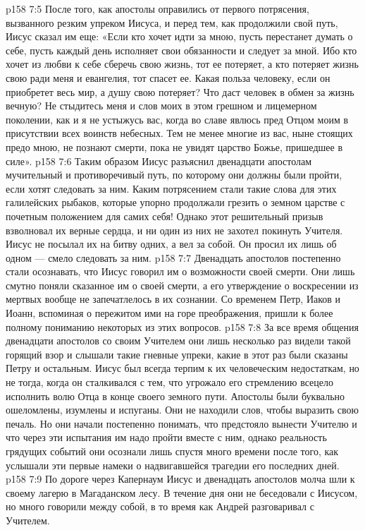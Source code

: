 \vs p158 7:5 После того, как апостолы оправились от первого потрясения, вызванного резким упреком Иисуса, и перед тем, как продолжили свой путь, Иисус сказал им еще: «Если кто хочет идти за мною, пусть перестанет думать о себе, пусть каждый день исполняет свои обязанности и следует за мной. Ибо кто хочет из любви к себе сберечь свою жизнь, тот ее потеряет, а кто потеряет жизнь свою ради меня и евангелия, тот спасет ее. Какая польза человеку, если он приобретет весь мир, а душу свою потеряет? Что даст человек в обмен за жизнь вечную? Не стыдитесь меня и слов моих в этом грешном и лицемерном поколении, как и я не устыжусь вас, когда во славе явлюсь пред Отцом моим в присутствии всех воинств небесных. Тем не менее многие из вас, ныне стоящих предо мною, не познают смерти, пока не увидят царство Божье, пришедшее в силе».
\vs p158 7:6 Таким образом Иисус разъяснил двенадцати апостолам мучительный и противоречивый путь, по которому они должны были пройти, если хотят следовать за ним. Каким потрясением стали такие слова для этих галилейских рыбаков, которые упорно продолжали грезить о земном царстве с почетным положением для самих себя! Однако этот решительный призыв взволновал их верные сердца, и ни один из них не захотел покинуть Учителя. Иисус не посылал их на битву одних, а вел за собой. Он просил их лишь об одном --- смело следовать за ним.
\vs p158 7:7 Двенадцать апостолов постепенно стали осознавать, что Иисус говорил им о возможности своей смерти. Они лишь смутно поняли сказанное им о своей смерти, а его утверждение о воскресении из мертвых вообще не запечатлелось в их сознании. Со временем Петр, Иаков и Иоанн, вспоминая о пережитом ими на горе преображения, пришли к более полному пониманию некоторых из этих вопросов.
\vs p158 7:8 За все время общения двенадцати апостолов со своим Учителем они лишь несколько раз видели такой горящий взор и слышали такие гневные упреки, какие в этот раз были сказаны Петру и остальным. Иисус был всегда терпим к их человеческим недостаткам, но не тогда, когда он сталкивался с тем, что угрожало его стремлению всецело исполнить волю Отца в конце своего земного пути. Апостолы были буквально ошеломлены, изумлены и испуганы. Они не находили слов, чтобы выразить свою печаль. Но они начали постепенно понимать, что предстояло вынести Учителю и что через эти испытания им надо пройти вместе с ним, однако реальность грядущих событий они осознали лишь спустя много времени после того, как услышали эти первые намеки о надвигавшейся трагедии его последних дней.
\vs p158 7:9 По дороге через Капернаум Иисус и двенадцать апостолов молча шли к своему лагерю в Магаданском лесу. В течение дня они не беседовали с Иисусом, но много говорили между собой, в то время как Андрей разговаривал с Учителем.
